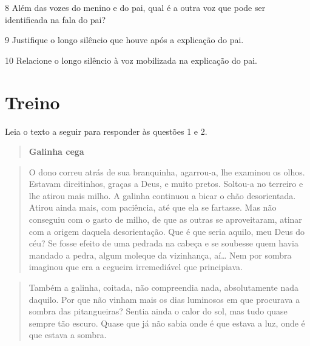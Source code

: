 \num{8} Além das vozes do menino e do pai, qual é a outra voz que pode
ser identificada na fala do pai?


\num{9} Justifique o longo silêncio que houve após a explicação do pai.


\num{10} Relacione o longo silêncio à voz mobilizada na explicação do
pai.


\section{Treino}

Leia o texto a seguir para responder às questões 1 e 2.

\begin{quote}
\centering\textbf{Galinha cega}
\end{quote}


\begin{quote}
O dono correu atrás de sua branquinha, agarrou-a, lhe examinou os olhos.
Estavam direitinhos, graças a Deus, e muito pretos. Soltou-a no terreiro
e lhe atirou mais milho. A galinha continuou a bicar o chão
desorientada. Atirou ainda mais, com paciência, até que ela se fartasse.
Mas não conseguiu com o gasto de milho, de que as outras se
aproveitaram, atinar com a origem daquela desorientação. Que é que seria
aquilo, meu Deus do céu? Se fosse efeito de uma pedrada na cabeça e se
soubesse quem havia mandado a pedra, algum moleque da vizinhança,
aí\ldots{} Nem por sombra imaginou que era a cegueira irremediável que
principiava.
\end{quote}

\begin{quote}
Também a galinha, coitada, não compreendia nada, absolutamente nada
daquilo. Por que não vinham mais os dias luminosos em que procurava a
sombra das pitangueiras? Sentia ainda o calor do sol, mas tudo quase
sempre tão escuro. Quase que já não sabia onde é que estava a luz, onde
é que estava a sombra.
\end{quote}

